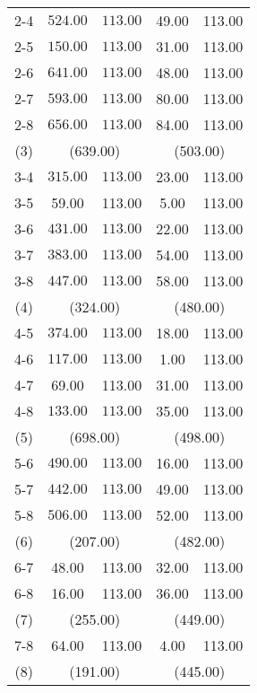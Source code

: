 \begin{table}[ht]
\begin{tabular*}{\textwidth}{@{\extracolsep{\fill} }ccccc}
  2-4 & \(\mathbf{524.00}\) & \(\mathbf{113.00}\) & 49.00 & 113.00 \\ 
  2-5 & \(\mathbf{150.00}\) & \(\mathbf{113.00}\) & 31.00 & 113.00 \\ 
  2-6 & \(\mathbf{641.00}\) & \(\mathbf{113.00}\) & 48.00 & 113.00 \\ 
  2-7 & \(\mathbf{593.00}\) & \(\mathbf{113.00}\) & 80.00 & 113.00 \\ 
  2-8 & \(\mathbf{656.00}\) & \(\mathbf{113.00}\) & 84.00 & 113.00 \\ 
   [1ex]
(3) & \multicolumn{2}{c}{(639.00)} & \multicolumn{2}{c}{(503.00)} \\
   3-4 & \(\mathbf{315.00}\) & \(\mathbf{113.00}\) & 23.00 & 113.00 \\ 
  3-5 & 59.00 & 113.00 & 5.00 & 113.00 \\ 
  3-6 & \(\mathbf{431.00}\) & \(\mathbf{113.00}\) & 22.00 & 113.00 \\ 
  3-7 & \(\mathbf{383.00}\) & \(\mathbf{113.00}\) & 54.00 & 113.00 \\ 
  3-8 & \(\mathbf{447.00}\) & \(\mathbf{113.00}\) & 58.00 & 113.00 \\ 
   [1ex]
(4) & \multicolumn{2}{c}{(324.00)} & \multicolumn{2}{c}{(480.00)} \\   
   4-5 & \(\mathbf{374.00}\) & \(\mathbf{113.00}\) & 18.00 & 113.00 \\ 
  4-6 & \(\mathbf{117.00}\) & \(\mathbf{113.00}\) & 1.00 & 113.00 \\ 
  4-7 & 69.00 & 113.00 & 31.00 & 113.00 \\ 
  4-8 & \(\mathbf{133.00}\) & \(\mathbf{113.00}\) & 35.00 & 113.00 \\ 
   [1ex]
(5) & \multicolumn{2}{c}{(698.00)} & \multicolumn{2}{c}{(498.00)} \\   
   5-6 & \(\mathbf{490.00}\) & \(\mathbf{113.00}\) & 16.00 & 113.00 \\ 
  5-7 & \(\mathbf{442.00}\) & \(\mathbf{113.00}\) & 49.00 & 113.00 \\ 
  5-8 & \(\mathbf{506.00}\) & \(\mathbf{113.00}\) & 52.00 & 113.00 \\ 
   [1ex]
(6) & \multicolumn{2}{c}{(207.00)} & \multicolumn{2}{c}{(482.00)} \\   
   6-7 & 48.00 & 113.00 & 32.00 & 113.00 \\ 
  6-8 & 16.00 & 113.00 & 36.00 & 113.00 \\ 
   [1ex]
   (7) & \multicolumn{2}{c}{(255.00)} & \multicolumn{2}{c}{(449.00)} \\
   7-8 & 64.00 & 113.00 & 4.00 & 113.00 \\[1ex]
   (8) & \multicolumn{2}{c}{(191.00)} & \multicolumn{2}{c}{(445.00)} \\ 
   \bottomrule
\end{tabular*}

\end{table}
